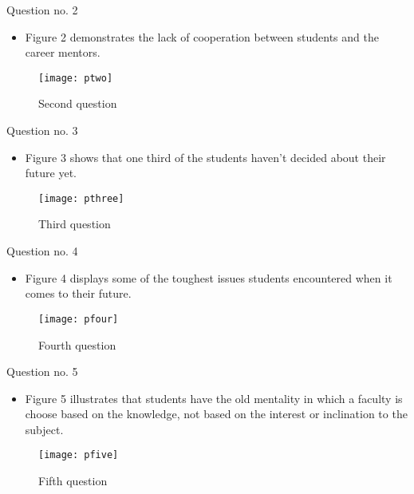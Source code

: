 \documentclass{beamer}
\begin{document}

\begin{frame}{Question no. 2}
	
	\begin{itemize}
		\item Figure 2 demonstrates the lack of cooperation between students and the career mentors.
	\end{itemize}
	
	\begin{figure}[t]
		\texttt{[image: ptwo]}
		\centering
		\caption{Second question}
	\end{figure}
\end{frame}


\begin{frame}{Question no. 3}
	
	\begin{itemize}
		\item Figure 3 shows that one third of the students haven't decided about their future yet.
	\end{itemize}
	
	\begin{figure}[t]
		\texttt{[image: pthree]}
		\centering
		\caption{Third question}
	\end{figure}
\end{frame}


\begin{frame}{Question no. 4}
	
	\begin{itemize}
		\item Figure 4 displays some of the toughest issues students encountered when it comes to their future.
	\end{itemize}
	
	\begin{figure}[t]
		\texttt{[image: pfour]}
		\centering
		\caption{Fourth question}
	\end{figure}
\end{frame}


\begin{frame}{Question no. 5}
	
	\begin{itemize}
		\item Figure 5 illustrates that students have the old mentality in which a faculty is choose based on the knowledge, not based on the interest or inclination to the subject.
	\end{itemize}
	
	\begin{figure}[t]
		\texttt{[image: pfive]}
		\centering
		\caption{Fifth question}
	\end{figure}
\end{frame}
\end{document}
